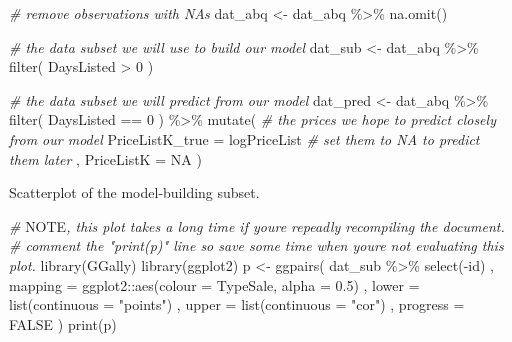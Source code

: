 \documentclass[
  12pt,
]{article}
\newenvironment{Shaded}{\begin{snugshade}}{\end{snugshade}}
\newcommand{\AlertTok}[1]{\textcolor[rgb]{0.94,0.16,0.16}{#1}}
\newcommand{\AttributeTok}[1]{\textcolor[rgb]{0.77,0.63,0.00}{#1}}
\newcommand{\CommentTok}[1]{\textcolor[rgb]{0.56,0.35,0.01}{\textit{#1}}}
\newcommand{\ConstantTok}[1]{\textcolor[rgb]{0.00,0.00,0.00}{#1}}
\newcommand{\DecValTok}[1]{\textcolor[rgb]{0.00,0.00,0.81}{#1}}
\newcommand{\FloatTok}[1]{\textcolor[rgb]{0.00,0.00,0.81}{#1}}
\newcommand{\FunctionTok}[1]{\textcolor[rgb]{0.00,0.00,0.00}{#1}}
\newcommand{\NormalTok}[1]{#1}
\newcommand{\OtherTok}[1]{\textcolor[rgb]{0.56,0.35,0.01}{#1}}
\newcommand{\SpecialCharTok}[1]{\textcolor[rgb]{0.00,0.00,0.00}{#1}}
\newcommand{\StringTok}[1]{\textcolor[rgb]{0.31,0.60,0.02}{#1}}
\begin{document}
\begin{Shaded}
\begin{Highlighting}[]
\CommentTok{\# remove observations with NAs}
\NormalTok{dat\_abq }\OtherTok{\textless{}{-}}
\NormalTok{  dat\_abq }\SpecialCharTok{\%\textgreater{}\%}
  \FunctionTok{na.omit}\NormalTok{()}

\CommentTok{\# the data subset we will use to build our model}
\NormalTok{dat\_sub }\OtherTok{\textless{}{-}}
\NormalTok{  dat\_abq }\SpecialCharTok{\%\textgreater{}\%}
  \FunctionTok{filter}\NormalTok{(}
\NormalTok{    DaysListed }\SpecialCharTok{\textgreater{}} \DecValTok{0}
\NormalTok{  )}

\CommentTok{\# the data subset we will predict from our model}
\NormalTok{dat\_pred }\OtherTok{\textless{}{-}}
\NormalTok{  dat\_abq }\SpecialCharTok{\%\textgreater{}\%}
  \FunctionTok{filter}\NormalTok{(}
\NormalTok{    DaysListed }\SpecialCharTok{==} \DecValTok{0}
\NormalTok{  ) }\SpecialCharTok{\%\textgreater{}\%}
  \FunctionTok{mutate}\NormalTok{(}
    \CommentTok{\# the prices we hope to predict closely from our model}
    \AttributeTok{PriceListK\_true =}\NormalTok{ logPriceList}
    \CommentTok{\# set them to NA to predict them later}
\NormalTok{  , }\AttributeTok{PriceListK =} \ConstantTok{NA}
\NormalTok{  )}
\end{Highlighting}
\end{Shaded}

Scatterplot of the model-building subset.

\begin{Shaded}
\begin{Highlighting}[]
\CommentTok{\# }\AlertTok{NOTE}\CommentTok{, this plot takes a long time if you\textquotesingle{}re repeadly recompiling the document.}
\CommentTok{\# comment the "print(p)" line so save some time when you\textquotesingle{}re not evaluating this plot.}
\FunctionTok{library}\NormalTok{(GGally)}
\FunctionTok{library}\NormalTok{(ggplot2)}
\NormalTok{p }\OtherTok{\textless{}{-}}
  \FunctionTok{ggpairs}\NormalTok{(}
\NormalTok{    dat\_sub }\SpecialCharTok{\%\textgreater{}\%} \FunctionTok{select}\NormalTok{(}\SpecialCharTok{{-}}\NormalTok{id)}
\NormalTok{  , }\AttributeTok{mapping =}\NormalTok{ ggplot2}\SpecialCharTok{::}\FunctionTok{aes}\NormalTok{(}\AttributeTok{colour =}\NormalTok{ TypeSale, }\AttributeTok{alpha =} \FloatTok{0.5}\NormalTok{)}
\NormalTok{  , }\AttributeTok{lower =} \FunctionTok{list}\NormalTok{(}\AttributeTok{continuous =} \StringTok{"points"}\NormalTok{)}
\NormalTok{  , }\AttributeTok{upper =} \FunctionTok{list}\NormalTok{(}\AttributeTok{continuous =} \StringTok{"cor"}\NormalTok{)}
\NormalTok{  , }\AttributeTok{progress =} \ConstantTok{FALSE}
\NormalTok{  )}
\FunctionTok{print}\NormalTok{(p)}
\end{Highlighting}
\end{Shaded}
\end{document}
